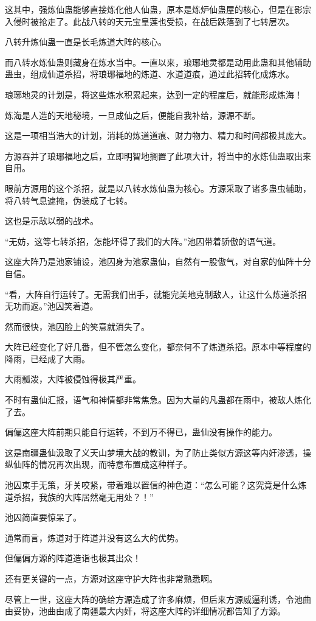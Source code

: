 \begin{this_body}
这其中，强炼仙蛊能够直接炼化他人仙蛊，原本是炼炉仙蛊屋的核心，但是在影宗入侵时被抢走了。此战八转的天元宝皇莲也受损，在战后跌落到了七转层次。

八转升炼仙蛊一直是长毛炼道大阵的核心。

而八转水炼仙蛊则藏身在炼水当中。一直以来，琅琊地灵都是动用此蛊和其他辅助蛊虫，组成仙道杀招，将琅琊福地的炼道、水道道痕，通过此招转化成炼水。

琅琊地灵的计划是，将这些炼水积累起来，达到一定的程度后，就能形成炼海！

炼海是人造的天地秘境，一旦成仙之后，便能自我补给，源源不断。

这是一项相当浩大的计划，消耗的炼道道痕、财力物力、精力和时间都极其庞大。

方源吞并了琅琊福地之后，立即明智地搁置了此项大计，将当中的水炼仙蛊取出来自用。

眼前方源用的这个杀招，就是以八转水炼仙蛊为核心。方源采取了诸多蛊虫辅助，将八转气息遮掩，伪装成了七转。

这也是示敌以弱的战术。

“无妨，这等七转杀招，怎能坏得了我们的大阵。”池囚带着骄傲的语气道。

这座大阵乃是池家铺设，池囚身为池家蛊仙，自然有一股傲气，对自家的仙阵十分自信。

“看，大阵自行运转了。无需我们出手，就能完美地克制敌人，让这什么炼道杀招无功而返。”池囚笑着道。

然而很快，池囚脸上的笑意就消失了。

大阵已经变化了好几番，但不管怎么变化，都奈何不了炼道杀招。原本中等程度的降雨，已经成了大雨。

大雨瓢泼，大阵被侵蚀得极其严重。

不时有蛊仙汇报，语气和神情都非常焦急。因为大量的凡蛊都在雨中，被敌人炼化了去。

偏偏这座大阵前期只能自行运转，不到万不得已，蛊仙没有操作的能力。

这是南疆蛊仙汲取了义天山梦境大战的教训，为了防止类似方源这等内奸渗透，操纵仙阵的情况再次出现，而特意布置成这种样子。

池囚束手无策，牙关咬紧，带着难以置信的神色道：“怎么可能？这究竟是什么炼道杀招，我族的大阵居然毫无用处？！”

池囚简直要惊呆了。

通常而言，炼道对于阵道并没有这么大的优势。

但偏偏方源的阵道造诣也极其出众！

还有更关键的一点，方源对这座守护大阵也非常熟悉啊。

尽管上一世，这座大阵的确给方源造成了许多麻烦，但后来方源威逼利诱，令池曲由妥协，池曲由成了南疆最大内奸，将这座大阵的详细情况都告知了方源。


\end{this_body}
